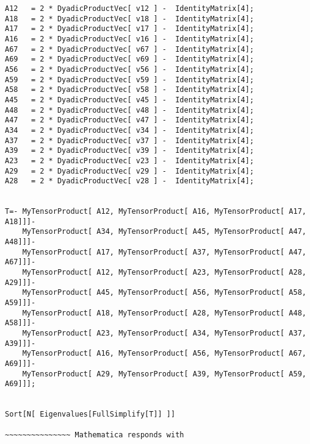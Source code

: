 \documentclass[%
  twocolumn,
 showpacs,
 showkeys,
 preprintnumbers,
 amsmath,amssymb,
 aps,
  pra,
  longbibliography,
 floatfix,
 ]{revtex4-1}
\begin{document}
{\begin{lstlisting}[backgroundcolor=\color{yellow!10},framerule=0pt,breaklines=true, frame=tb]
A12   = 2 * DyadicProductVec[ v12 ] -  IdentityMatrix[4];
A18   = 2 * DyadicProductVec[ v18 ] -  IdentityMatrix[4];
A17   = 2 * DyadicProductVec[ v17 ] -  IdentityMatrix[4];
A16   = 2 * DyadicProductVec[ v16 ] -  IdentityMatrix[4];
A67   = 2 * DyadicProductVec[ v67 ] -  IdentityMatrix[4];
A69   = 2 * DyadicProductVec[ v69 ] -  IdentityMatrix[4];
A56   = 2 * DyadicProductVec[ v56 ] -  IdentityMatrix[4];
A59   = 2 * DyadicProductVec[ v59 ] -  IdentityMatrix[4];
A58   = 2 * DyadicProductVec[ v58 ] -  IdentityMatrix[4];
A45   = 2 * DyadicProductVec[ v45 ] -  IdentityMatrix[4];
A48   = 2 * DyadicProductVec[ v48 ] -  IdentityMatrix[4];
A47   = 2 * DyadicProductVec[ v47 ] -  IdentityMatrix[4];
A34   = 2 * DyadicProductVec[ v34 ] -  IdentityMatrix[4];
A37   = 2 * DyadicProductVec[ v37 ] -  IdentityMatrix[4];
A39   = 2 * DyadicProductVec[ v39 ] -  IdentityMatrix[4];
A23   = 2 * DyadicProductVec[ v23 ] -  IdentityMatrix[4];
A29   = 2 * DyadicProductVec[ v29 ] -  IdentityMatrix[4];
A28   = 2 * DyadicProductVec[ v28 ] -  IdentityMatrix[4];


T=- MyTensorProduct[ A12, MyTensorProduct[ A16, MyTensorProduct[ A17,  A18]]]-
    MyTensorProduct[ A34, MyTensorProduct[ A45, MyTensorProduct[ A47,  A48]]]-
    MyTensorProduct[ A17, MyTensorProduct[ A37, MyTensorProduct[ A47,  A67]]]-
    MyTensorProduct[ A12, MyTensorProduct[ A23, MyTensorProduct[ A28,  A29]]]-
    MyTensorProduct[ A45, MyTensorProduct[ A56, MyTensorProduct[ A58,  A59]]]-
    MyTensorProduct[ A18, MyTensorProduct[ A28, MyTensorProduct[ A48,  A58]]]-
    MyTensorProduct[ A23, MyTensorProduct[ A34, MyTensorProduct[ A37,  A39]]]-
    MyTensorProduct[ A16, MyTensorProduct[ A56, MyTensorProduct[ A67,  A69]]]-
    MyTensorProduct[ A29, MyTensorProduct[ A39, MyTensorProduct[ A59,  A69]]];


Sort[N[ Eigenvalues[FullSimplify[T]] ]]

~~~~~~~~~~~~~~~ Mathematica responds with


\end{lstlisting}}
\end{document}
